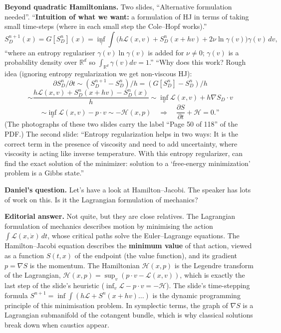 \medskip\noindent
{\bf Beyond quadratic Hamiltonians.}
Two slides, ``Alternative formulation
needed''. ``{\bf Intuition of what we want:}
a formulation of HJ in terms of taking small
time-steps (where in each small step the
Cole--Hopf works).''
$$
S_D^{n+1}(x)=G[S_D^n](x)
=\inf_\gamma\int\bigl(h\mathcal{L}(x,v)
+S_D^n(x+hv)+2\nu\ln\gamma(v)\bigr)
\gamma(v)\,dv,
$$
``where an entropy regulariser
$\gamma(v)\ln\gamma(v)$ is added for
$\nu\ne0$; $\gamma(v)$ is a probability
density over $\mathbb{R}^d$ so
$\int_{\mathbb{R}^d}\gamma(v)dv=1$.'' ``Why
does this work? Rough idea (ignoring
entropy regularization we get non-viscous
HJ):
$$
\partial S_D^n/\partial t\sim
(S_D^{n+1}-S_D^n)/h=(G[S_D^n]-S_D^n)/h
$$
$$
\sim\frac{h\mathcal{L}(x,v)+S_D^n(x+hv)
-S_D^n(x)}{h}
\sim\inf_v\mathcal{L}(x,v)+h\nabla S_D\cdot v
$$
$$
\sim\inf_v\mathcal{L}(x,v)-p\cdot v
\sim-\mathcal{H}(x,p)
\quad\Longrightarrow\quad
\frac{\partial S}{\partial t}
+\mathcal{H}=0.\text{''}
$$
(The photographs of these two slides carry
the label ``Page 50 of 118'' of the PDF.)
The second slide: ``Entropy regularization
helps in two ways: It is the correct term in
the presence of viscosity and need to add
uncertainty, where viscosity is acting like
inverse temperature. With this entropy
regularizer, can find the exact solution of the
minimizer: solution to a `free-energy
minimization' problem is a Gibbs state.''

\medskip\noindent
{\bf Daniel's question.}
Let's have a look at Hamilton--Jacobi. The
speaker has lots of work on this. Is it the
Lagrangian formulation of mechanics?

\medskip\noindent
{\bf Editorial answer.}
Not quite, but they are close relatives. The
Lagrangian formulation of mechanics describes
motion by minimising the action
$\int\mathcal{L}(x,\dot x)\,dt$, whose
critical paths solve the Euler--Lagrange
equations. The Hamilton--Jacobi equation
describes the {\bf minimum value} of that
action, viewed as a function $S(t,x)$ of
the endpoint (the value function), and its
gradient $p=\nabla S$ is the momentum. The
Hamiltonian $\mathcal{H}(x,p)$ is the
Legendre transform of the Lagrangian,
$\mathcal{H}(x,p)=\sup_v(p\cdot v-\mathcal{L}
(x,v))$, which is exactly the last step of
the slide's heuristic ($\inf_v\mathcal{L}-p
\cdot v=-\mathcal{H}$). The slide's
time-stepping formula $S^{n+1}=\inf\int
(h\mathcal{L}+S^n(x+hv)\dots)$ is the
dynamic programming principle of this
minimisation problem. In symplectic
terms, the graph of $\nabla S$ is a
Lagrangian submanifold of the cotangent
bundle, which is why classical solutions
break down when caustics appear.


